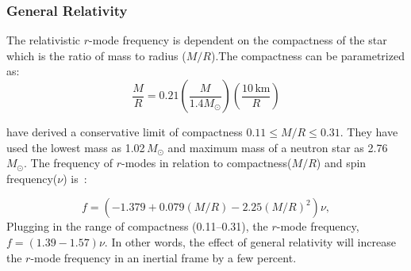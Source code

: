 \documentclass{ttuthes2007}
\begin{document}
\subsubsection{General Relativity}
The relativistic $r$-mode frequency is dependent on the compactness of the star which is the ratio
of mass to radius ($M/R$).The compactness can be parametrized as:
\begin{equation}
\frac{M}{R}=0.21\left(\frac{M}{1.4M_\odot}\right)\left(\frac{10\,\mathrm{km}}{R}\right)
\end{equation} 

\citet{Idrisy_2015} have derived a conservative limit of compactness $0.11 \leq
M/R \leq 0.31$. They have used the lowest mass as 1.02\,$M_\odot$ and maximum
mass of a neutron star as 2.76\,$M_\odot$. The frequency of $r$-modes in relation to
compactness($M/R$) and spin frequency($\nu$) is~\cite{Idrisy_2015}: 

\begin{equation}
f=(-1.379 + 0.079(M/R) - 2.25(M/R)^2)\nu,
\end{equation}  
Plugging in the range of compactness (0.11--0.31), the $r$-mode frequency,
$f=(1.39-1.57)\nu$.
In other words, the effect of general relativity will increase the $r$-mode frequency in an inertial frame by a few percent.
\end{document}
